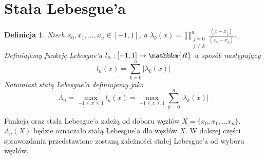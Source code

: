 \documentclass{article}
\newtheorem{defi}{Definicja}
\begin{document}
\section{Stała Lebesgue'a}

\begin{defi}
Niech $x_0, x_1, ..., x_n \in [-1, 1]$, a $\lambda_k(x) = \prod_{\substack{j = 0\\j \neq k}}^n \frac{(x - x_j)}{(x_k - x_j)} $.
Definiujemy funkcję Lebesgue'a $l_n : [-1, 1] \to \mathbbm{R}$ w sposób następujący
\begin{equation*}
l_n(x) = \sum_{k = 0}^n |\lambda_k(x)|
\end{equation*}
Natomiast stałą Lebesgue'a definiujemy jako 
\begin{equation*}
\Lambda_n = \max_{-1 \leq x \leq 1} l_n(x) = \max_{-1 \leq x \leq 1} \sum_{k = 0}^n |\lambda_k(x)|
\end{equation*}
\end{defi}

Funkcja oraz stała Lebesgue'a zależą od doboru węzłów $X = \{x_0, x_1, ... x_n \}$. $\Lambda_n(X)$ będzie oznaczało stałą Lebesgue'a dla węzłów $X$. W dalszej części sprawozdania przedstawione zostaną zależności stałej Lebesgue'a od wyboru węzłów.
\end{document}
